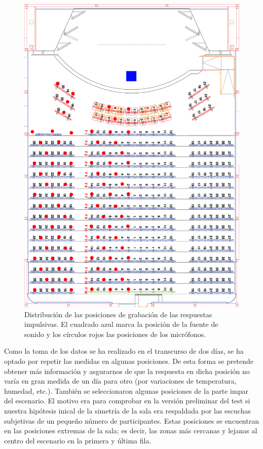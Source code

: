 \documentclass[11pt,a4paper,twoside]{book}
\begin{document}
		    \begin{figure}
	            \includegraphics[scale=0.45]{../imagenes/auditorio_butacas_marcadas}
			    \centering
			    \caption{Distribución de las posiciones de grabación de las respuestas impulsivas. El cuadrado azul marca la posición de la fuente de sonido y los círculos rojos las posiciones de los micrófonos.}
			    \label{fig:butacasMarcadas}
	        \end{figure}

		    Como la toma de los datos se ha realizado en el transcurso de dos días, se ha optado por repetir las medidas en algunas posiciones. De esta forma se pretende obtener más información y asgurarnos de que la respuesta en dicha posición no varía en gran medida de un día para otro (por variaciones de temperatura, humedad, etc.). También se seleccionaron algunas posiciones de la parte impar del escenario. El motivo era para comprobar en la versión preliminar del test si nuestra hipótesis inical de la simetría de la sala era respaldada por las escuchas subjetivas de un pequeño número de participantes. Estas posiciones se encuentran en las posiciones extremas de la sala; es decir, las zonas más cercanas y lejanas al centro del escenario en la primera y última fila.
\end{document}
